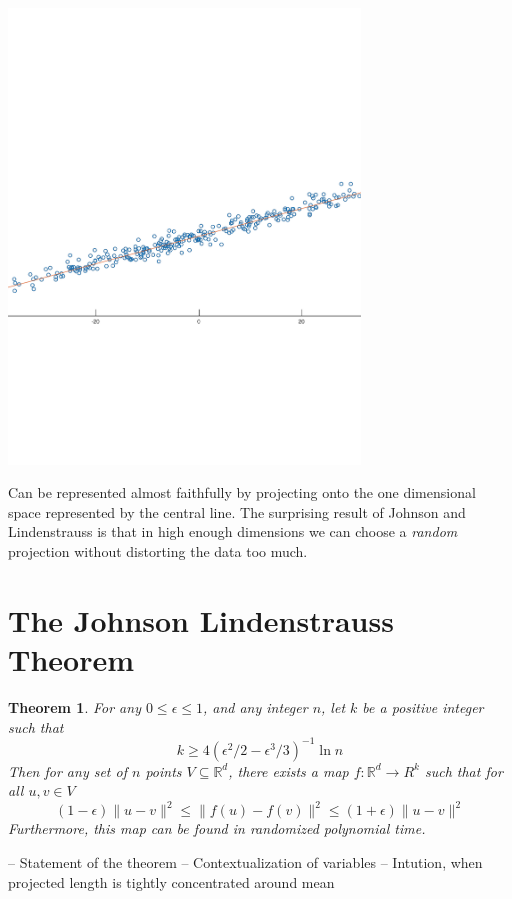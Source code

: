 \documentclass[11pt]{article}
\newcommand{\arr}{\rightarrow}
\newcommand{\R}{\mathbb{R}}
\newtheorem{Thm}{Theorem}
\begin{document}
\begin{center}
    \includegraphics[trim=0 240 0 280, clip,width=0.7\textwidth]{2dprimaryaxis.pdf}
\end{center}

Can be represented almost faithfully by projecting onto the one dimensional space represented by the central line. The surprising result of Johnson and Lindenstrauss is that in high enough dimensions we can choose a \textit{random} projection without distorting the data too much.


\section{The Johnson Lindenstrauss Theorem}
\begin{Thm}

    For any $0 \leq \epsilon \leq 1$, and any integer $n$, let $k$ be a positive
    integer such that
    \[ 
      k \geq 4(\epsilon^2/2 - \epsilon^3/3)^{-1} \ln n 
    \]
    Then for any set of $n$ points $V \subseteq \R^d$, there exists a map
    $f:\R^d \arr R^k$ such that for all $u, v \in V$
    \[
      (1-\epsilon)\|u - v\|^2 \leq \| f(u) - f(v) \|^2 \leq (1+\epsilon) \| u - v \|^2 
    \]
    Furthermore, this map can be found in randomized polynomial time.
\end{Thm}

-- Statement of the theorem
-- Contextualization of variables
-- Intution, when projected length is tightly concentrated around mean
\end{document}
